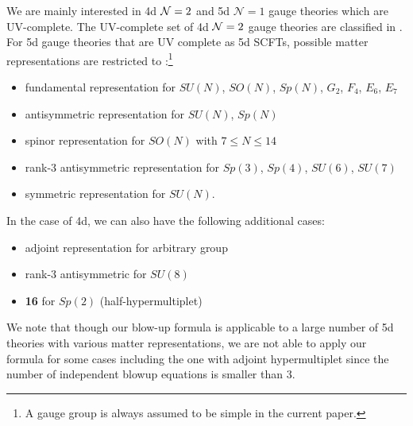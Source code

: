 \documentclass[letterpaper, 11pt]{article}
\def\CN{{\cal N}}
\begin{document}
We are mainly interested in 4d $\CN=2$ and 5d $\mathcal{N}=1$ gauge theories which are UV-complete. The UV-complete set of 4d $\CN=2$ gauge theories are classified in \cite{Bhardwaj:2013qia}. For 5d gauge theories that are UV complete as 5d SCFTs,  possible matter representations are restricted to \cite{Jefferson:2017ahm}:\footnote{A gauge group is always assumed to be simple in the current paper.}
\begin{itemize}
  \item fundamental representation for $SU(N)$, $SO(N)$, $Sp(N)$, $G_2$, $F_4$, $E_6$, $E_7$
  \item antisymmetric representation for $SU(N)$, $Sp(N)$
  \item spinor representation for $SO(N)$ with $7 \leq N \leq 14$
  \item rank-3 antisymmetric representation for $Sp(3)$, $Sp(4)$, $SU(6)$, $SU(7)$
  \item symmetric representation for $SU(N)$.
\end{itemize}
In the case of 4d, we can also have the following additional cases: 
\begin{itemize}
	\item adjoint representation for arbitrary group
	\item rank-3 antisymmetric for $SU(8)$
	\item \textbf{16} for $Sp(2)$ (half-hypermultiplet)
\end{itemize}
We note that though our blow-up formula is applicable to a large number of 5d theories with various matter representations, we are not able to apply our formula for some cases including the one with adjoint hypermultiplet since the number of independent blowup equations is smaller than 3.
\end{document}
